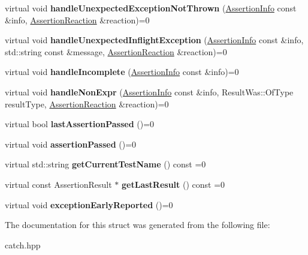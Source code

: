 \begin{DoxyCompactItemize}
virtual void {\bfseries handle\+Unexpected\+Exception\+Not\+Thrown} (\mbox{\hyperlink{structCatch_1_1AssertionInfo}{Assertion\+Info}} const \&info, \mbox{\hyperlink{structCatch_1_1AssertionReaction}{Assertion\+Reaction}} \&reaction)=0
\item 
\mbox{\label{structCatch_1_1IResultCapture_afc97bc69829185222f955ebeef97adfe}} 
virtual void {\bfseries handle\+Unexpected\+Inflight\+Exception} (\mbox{\hyperlink{structCatch_1_1AssertionInfo}{Assertion\+Info}} const \&info, std\+::string const \&message, \mbox{\hyperlink{structCatch_1_1AssertionReaction}{Assertion\+Reaction}} \&reaction)=0
\item 
\mbox{\label{structCatch_1_1IResultCapture_a89b89372eb09cc44f8dcad363de6157d}} 
virtual void {\bfseries handle\+Incomplete} (\mbox{\hyperlink{structCatch_1_1AssertionInfo}{Assertion\+Info}} const \&info)=0
\item 
\mbox{\label{structCatch_1_1IResultCapture_ab7dbdf8aa28427119583e24dbb302c63}} 
virtual void {\bfseries handle\+Non\+Expr} (\mbox{\hyperlink{structCatch_1_1AssertionInfo}{Assertion\+Info}} const \&info, Result\+Was\+::\+Of\+Type result\+Type, \mbox{\hyperlink{structCatch_1_1AssertionReaction}{Assertion\+Reaction}} \&reaction)=0
\item 
\mbox{\label{structCatch_1_1IResultCapture_a973435fbdcb2f6f07a0ec5719a01e956}} 
virtual bool {\bfseries last\+Assertion\+Passed} ()=0
\item 
\mbox{\label{structCatch_1_1IResultCapture_a9b0ef2cb071e9a9dc6ec1b533026aea7}} 
virtual void {\bfseries assertion\+Passed} ()=0
\item 
\mbox{\label{structCatch_1_1IResultCapture_aea1617f4a84cc648246aa3ed6918b5bf}} 
virtual std\+::string {\bfseries get\+Current\+Test\+Name} () const =0
\item 
\mbox{\label{structCatch_1_1IResultCapture_ab18872c89fab97405a56e9c6a4919736}} 
virtual const Assertion\+Result $\ast$ {\bfseries get\+Last\+Result} () const =0
\item 
\mbox{\label{structCatch_1_1IResultCapture_ae63ecec95db4c236c63ecf616f483810}} 
virtual void {\bfseries exception\+Early\+Reported} ()=0
\end{DoxyCompactItemize}


The documentation for this struct was generated from the following file\+:\begin{DoxyCompactItemize}
\item 
catch.\+hpp\end{DoxyCompactItemize}
